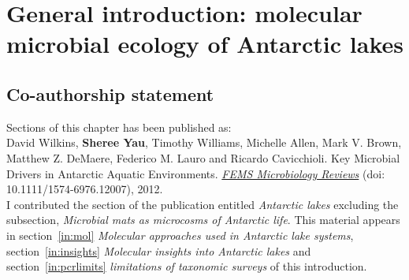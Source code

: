 \chapter[General introduction]{General introduction: molecular microbial ecology of Antarctic lakes}
\label{ch:intro}


\section*{Co-authorship statement}

Sections of this chapter has been published as:\\

David Wilkins, \textbf{Sheree Yau}, Timothy Williams, Michelle Allen, Mark V. Brown, Matthew Z. DeMaere, Federico M. Lauro and Ricardo Cavicchioli. 
Key Microbial Drivers in Antarctic Aquatic Environments.
\textit{\underline{FEMS Microbiology Reviews}} 
(doi: 10.1111/1574-6976.12007), 2012.\\

I contributed the section of the publication entitled \emph{Antarctic lakes} excluding the subsection, \emph{Microbial mats as microcosms of Antarctic life}.
This material appears in section~\ref{in:mol} \emph{Molecular approaches used in Antarctic lake systems}, section~\ref{in:insights} \emph{Molecular insights into Antarctic lakes} and section~\ref{in:pcrlimits} \emph{limitations of taxonomic surveys} of this introduction.
\newpage


